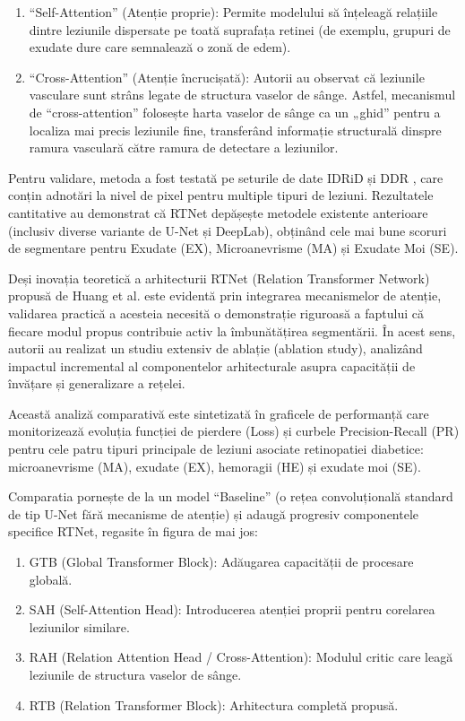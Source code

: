 \documentclass[12pt, a4paper, oneside, romanian]{teza-upb}
\begin{document}
\begin{enumerate}
  \item “Self-Attention” (Atenție proprie): Permite modelului să înțeleagă relațiile dintre leziunile
        dispersate pe toată suprafața retinei (de exemplu, grupuri de exudate dure care semnalează o
        zonă de edem).

\item “Cross-Attention” (Atenție încrucișată): Autorii au observat că leziunile vasculare sunt strâns
      legate de structura vaselor de sânge. Astfel, mecanismul de “cross-attention” folosește harta
      vaselor de sânge ca un „ghid” pentru a localiza mai precis leziunile fine, transferând informație
      structurală dinspre ramura vasculară către ramura de detectare a leziunilor.
\end{enumerate}
\bigskip

Pentru validare, metoda a fost testată pe seturile de date IDRiD \cite{9_chetoui2020explainable} și DDR \cite{15_li2019diagnostic}, care conțin adnotări
la nivel de pixel pentru multiple tipuri de leziuni. Rezultatele cantitative au demonstrat că RTNet
depășește metodele existente anterioare (inclusiv diverse variante de U-Net și DeepLab), obținând cele
mai bune scoruri de segmentare pentru Exudate (EX), Microanevrisme (MA) și Exudate Moi (SE).
\bigskip

Deși inovația teoretică a arhitecturii RTNet (Relation Transformer Network) propusă de Huang et al.
\cite{7_huang2022rtnet} este evidentă prin integrarea mecanismelor de atenție, validarea practică a acesteia necesită o
demonstrație riguroasă a faptului că fiecare modul propus contribuie activ la îmbunătățirea segmentării.
În acest sens, autorii au realizat un studiu extensiv de ablație (ablation study), analizând impactul
incremental al componentelor arhitecturale asupra capacității de învățare și generalizare a rețelei.
\bigskip

Această analiză comparativă este sintetizată în graficele de performanță care monitorizează evoluția
funcției de pierdere (Loss) și curbele Precision-Recall (PR) pentru cele patru tipuri principale de leziuni
asociate retinopatiei diabetice: microanevrisme (MA), exudate (EX), hemoragii (HE) și exudate moi (SE).
\bigskip

Comparatia pornește de la un model “Baseline” (o rețea convoluțională standard de tip U-Net fără
mecanisme de atenție) și adaugă progresiv componentele specifice RTNet, regasite în figura de mai jos:

\begin{enumerate}
  \item GTB (Global Transformer Block): Adăugarea capacității de procesare globală.
  \item SAH (Self-Attention Head): Introducerea atenției proprii pentru corelarea leziunilor similare.
  \item RAH (Relation Attention Head / Cross-Attention): Modulul critic care leagă leziunile de structura
vaselor de sânge.
  \item RTB (Relation Transformer Block): Arhitectura completă propusă.
\end{enumerate}
\end{document}
